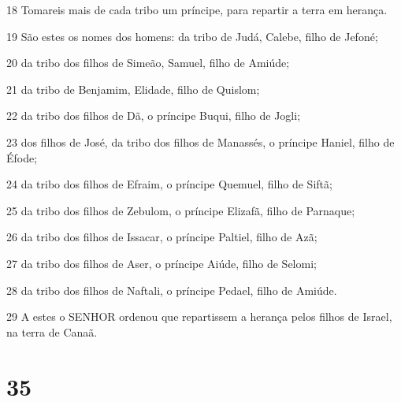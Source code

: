 \par 18 Tomareis mais de cada tribo um príncipe, para repartir a terra em herança.
\par 19 São estes os nomes dos homens: da tribo de Judá, Calebe, filho de Jefoné;
\par 20 da tribo dos filhos de Simeão, Samuel, filho de Amiúde;
\par 21 da tribo de Benjamim, Elidade, filho de Quislom;
\par 22 da tribo dos filhos de Dã, o príncipe Buqui, filho de Jogli;
\par 23 dos filhos de José, da tribo dos filhos de Manassés, o príncipe Haniel, filho de Éfode;
\par 24 da tribo dos filhos de Efraim, o príncipe Quemuel, filho de Siftã;
\par 25 da tribo dos filhos de Zebulom, o príncipe Elizafã, filho de Parnaque;
\par 26 da tribo dos filhos de Issacar, o príncipe Paltiel, filho de Azã;
\par 27 da tribo dos filhos de Aser, o príncipe Aiúde, filho de Selomi;
\par 28 da tribo dos filhos de Naftali, o príncipe Pedael, filho de Amiúde.
\par 29 A estes o SENHOR ordenou que repartissem a herança pelos filhos de Israel, na terra de Canaã.

\chapter{35}

